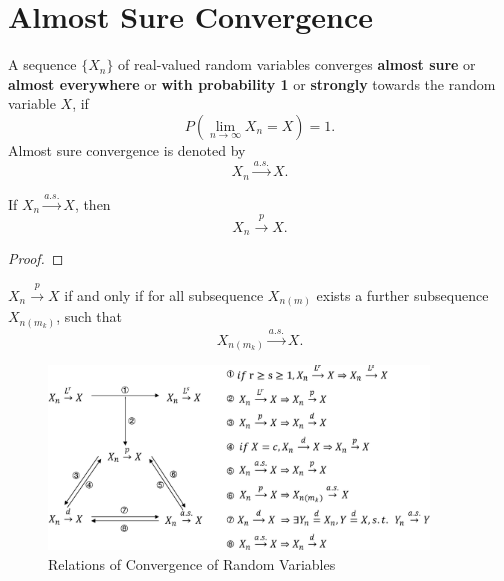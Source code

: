 \section{Almost Sure Convergence}

\begin{definition}
    A sequence $\{X_n\}$ of real-valued random variables converges \textbf{almost sure} or \textbf{almost everywhere} or \textbf{with probability 1} or \textbf{strongly} towards the random variable $X$, if
    \begin{equation}
        P\left(\lim_{n\to\infty}X_n=X\right)=1.
    \end{equation}
    Almost sure convergence is denoted by
    \begin{equation}
        X_n \stackrel{a.s.}{\rightarrow} X.
    \end{equation}
\end{definition}

\begin{note}

\end{note}

\begin{theorem}
    If $X_{n}\stackrel{a.s.}{\rightarrow}X$, then
    \begin{equation}
        X_{n}\stackrel{p}{\rightarrow}X.
    \end{equation}
\end{theorem}

\begin{proof}

\end{proof}

\begin{theorem}
    $X_n\stackrel{p}{\rightarrow}X$ if and only if for all subsequence $X_{n(m)}$ exists a further subsequence $X_{n(m_k)}$, such that
    \begin{equation}
        X_{n(m_k)}\stackrel{a.s.}{\rightarrow}X.
    \end{equation}
\end{theorem}

\begin{figure}[htp]
    \centering
    \includegraphics[width=0.9\textwidth]{./probability-theory/figures/relation-of-convergences.eps}
    \caption{Relations of Convergence of Random Variables}
\end{figure}

